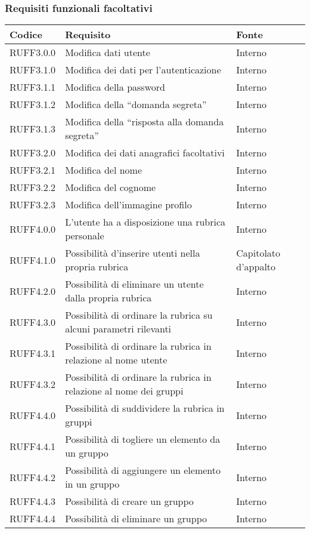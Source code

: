 \subsubsection{Requisiti funzionali facoltativi}

\begin{center}
\begin{longtable}{lp{}l}
\toprule Codice & Requisito & Fonte\\
\midrule
RUFF3.0.0 & Modifica dati utente & Interno \\
RUFF3.1.0 & Modifica dei dati per l'autenticazione & Interno \\
RUFF3.1.1 & Modifica della password & Interno\\
RUFF3.1.2 & Modifica della ``domanda segreta'' & Interno\\
RUFF3.1.3 & Modifica della ``risposta alla domanda segreta'' & Interno\\
RUFF3.2.0 & Modifica dei dati anagrafici facoltativi & Interno \\
RUFF3.2.1 & Modifica del nome & Interno\\
RUFF3.2.2 & Modifica del cognome & Interno\\
RUFF3.2.3 & Modifica dell'immagine profilo & Interno\\
RUFF4.0.0 & L'utente ha a disposizione una rubrica personale & Interno \\
RUFF4.1.0 & Possibilità d'inserire utenti nella propria rubrica & Capitolato d'appalto \\
RUFF4.2.0 & Possibilità di eliminare un utente dalla propria rubrica & Interno \\
RUFF4.3.0 & Possibilità di ordinare la rubrica su alcuni parametri rilevanti & Interno \\
RUFF4.3.1 & Possibilità di ordinare la rubrica in relazione al nome utente & Interno\\
RUFF4.3.2 & Possibilità di ordinare la rubrica in relazione al nome dei gruppi & Interno\\
RUFF4.4.0 & Possibilità di suddividere la rubrica in gruppi & Interno \\
RUFF4.4.1 & Possibilità di togliere un elemento da un gruppo & Interno \\
RUFF4.4.2 & Possibilità di aggiungere un elemento in un gruppo & Interno \\
RUFF4.4.3 & Possibilità di creare un gruppo & Interno \\
RUFF4.4.4 & Possibilità di eliminare un gruppo & Interno \\

\end{longtable}
\end{center}
